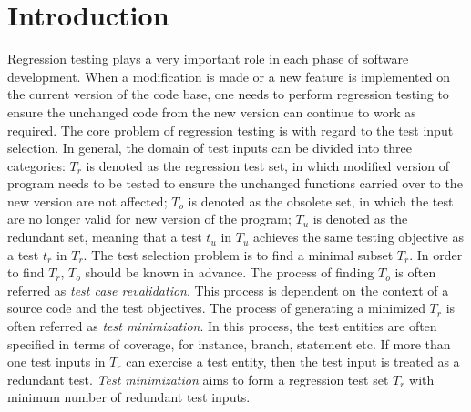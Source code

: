\documentclass[journal]{IEEEtran}
\begin{document}
\section{Introduction}
Regression testing plays a very important role in each phase of software development\cite{foundationOfSoftwareTesting}. When a modification is made or a new feature is implemented on the current version of the code base, one needs to perform regression testing to ensure the unchanged code from the new version can continue to work as required. The core problem of regression testing is with regard to the test input selection. In general, the domain of test inputs can be divided into three categories: \(T_r\) is denoted as the regression test set, in which modified version of program needs to be tested to ensure the unchanged functions carried over to the new version are not affected; \(T_o\) is denoted as the obsolete set, in which the test are no longer valid for new version of the program; \(T_u\) is denoted as the redundant set, meaning that a test \(t_u\) in \(T_u\) achieves the same testing objective as a test \(t_r\) in \(T_r\). The test selection problem is to find a minimal subset \(T_r\). In order to find \(T_r\), \(T_o\) should be known in advance. The process of finding \(T_o\) is often referred as \emph{test case revalidation}. This process is dependent on the context of a source code and the test objectives. The process of generating a minimized \(T_r\) is often referred as \emph{test minimization}. In this process, the test entities are often specified in terms of coverage, for instance, branch, statement etc. If more than one test inputs in \(T_r\) can exercise a test entity, then the test input is treated as a redundant test. \emph{Test minimization} aims to form a regression test set \(T_r\) with minimum number of redundant test inputs.
\end{document}
